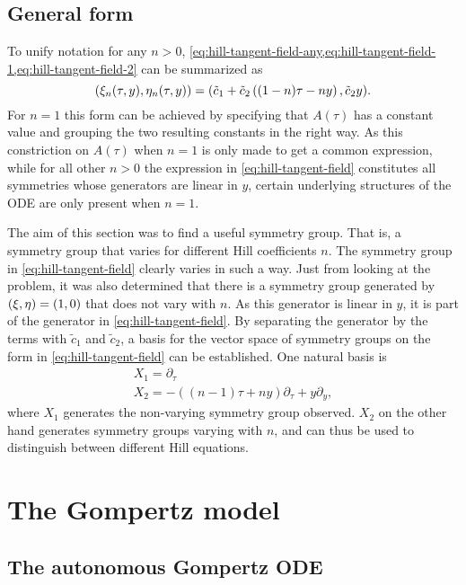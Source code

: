 \subsection{General form}

To unify notation for any \(n>0\), \cref{eq:hill-tangent-field-any,eq:hill-tangent-field-1,eq:hill-tangent-field-2} can be summarized as
\begin{equation} \label{eq:hill-tangent-field}
  \pqty{\xi_n(\tau,y),\eta_n(\tau,y)} = 
  \pqty{\tilde{c}_1 + \tilde{c}_2 \left( (1-n) \tau - n y \right), \tilde{c}_2 y}.
\end{equation}
For \(n=1\) this form can be achieved by specifying that \(A(\tau)\) has a constant value and grouping the two resulting constants in the right way.
As this constriction on \(A(\tau)\) when \(n=1\) is only made to get a common expression, while for all other \(n>0\) the expression in \cref{eq:hill-tangent-field} constitutes all symmetries whose generators are linear in \(y\), certain underlying structures of the ODE are only present when \(n=1\). %

The aim of this section was to find a useful symmetry group.
That is, a symmetry group that varies for different Hill coefficients \(n\).
The symmetry group in \cref{eq:hill-tangent-field} clearly varies in such a way.
Just from looking at the problem, it was also determined that there is a symmetry group generated by \(\pqty{\xi,\eta} = \pqty{1,0}\) that does not vary with \(n\).
As this generator is linear in \(y\), it is part of the generator in \cref{eq:hill-tangent-field}.
By separating the generator by the terms with \(\tilde{c}_1\) and \(\tilde{c}_2\), a basis for the vector space of symmetry groups on the form in \cref{eq:hill-tangent-field} can be established.
One natural basis is
\begin{gather}
  X_1 = \partial_\tau \\
  X_2 = - \left( (n-1) \tau + n y \right) \partial_\tau + y \partial_y,
\end{gather}
where \(X_1\) generates the non-varying symmetry group observed.
\(X_2\) on the other hand generates symmetry groups varying with \(n\), and can thus be used to distinguish between different Hill equations.

\section{The Gompertz model}

\subsection{The autonomous Gompertz ODE}

